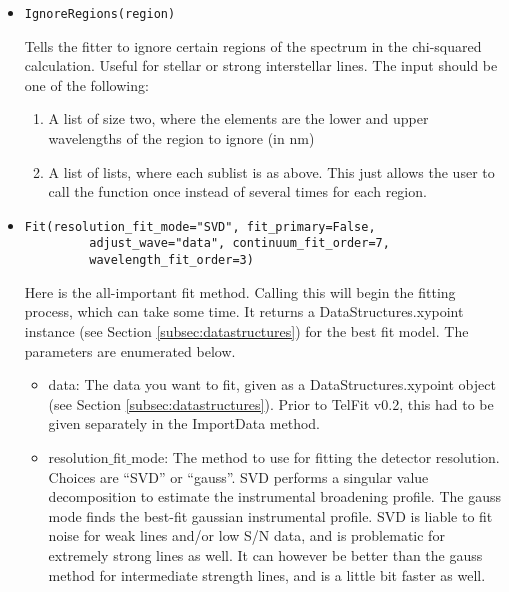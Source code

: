\documentclass{article}
\begin{document}
\begin{itemize}
  \item \begin{Verbatim}[commandchars=\\\{\}]
IgnoreRegions(region)
    \end{Verbatim}
    Tells the fitter to ignore certain regions of the spectrum in the chi-squared calculation. Useful for stellar or strong interstellar lines. The input should be one of the following:
    \begin{enumerate}
    \item A list of size two, where the elements are the lower and upper wavelengths of the region to ignore (in nm)
    \item A list of lists, where each sublist is as above. This just allows the user to call the function once instead of several times for each region.
    \end{enumerate}
    
  \item \begin{Verbatim}[commandchars=\\\{\}]
Fit(resolution_fit_mode="SVD", fit_primary=False,
         adjust_wave="data", continuum_fit_order=7, 
         wavelength_fit_order=3)
    \end{Verbatim}
    Here is the all-important fit method. Calling this will begin the fitting process, which can take some time. It returns a DataStructures.xypoint instance (see Section \ref{subsec:datastructures}) for the best fit model. The parameters are enumerated below.
    
    \begin{itemize}

      \item data: The data you want to fit, given as a DataStructures.xypoint object (see Section \ref{subsec:datastructures}). Prior to TelFit v0.2, this had to be given separately in the ImportData method.
    
      \item resolution$\_$fit$\_$mode: The method to use for fitting the detector resolution. Choices are ``SVD'' or ``gauss''. SVD performs a singular value decomposition to estimate the instrumental broadening profile. The gauss mode finds the best-fit gaussian instrumental profile. SVD is liable to fit noise for weak lines and/or low S/N data, and is problematic for extremely strong lines as well. It can however be better than the gauss method for intermediate strength lines, and is a little bit faster as well.
      

\end{itemize}
\end{itemize}
\end{document}
